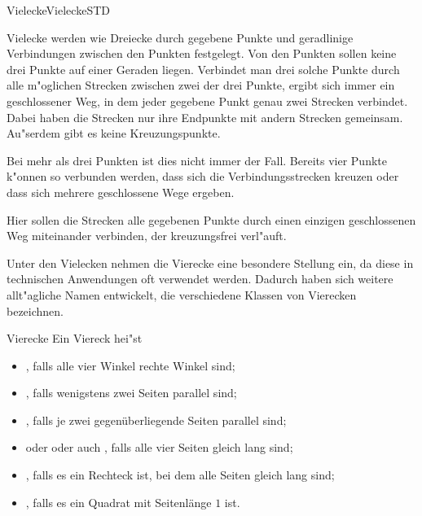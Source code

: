 \begin{MXContent}{Vielecke}{Vielecke}{STD}

Vielecke werden wie Dreiecke durch gegebene Punkte und geradlinige Verbindungen
zwischen den Punkten festgelegt. Von den Punkten sollen keine drei Punkte auf
einer Geraden liegen. Verbindet man drei solche Punkte durch alle m"oglichen 
Strecken zwischen zwei der drei Punkte, ergibt sich immer ein geschlossener Weg,
in dem jeder gegebene Punkt genau zwei Strecken verbindet. 
Dabei haben die Strecken nur ihre Endpunkte mit andern Strecken gemeinsam. 
Au"serdem gibt es keine Kreuzungspunkte.

Bei mehr als drei Punkten ist dies nicht immer der Fall. Bereits vier Punkte 
k"onnen so verbunden werden, dass sich die Verbindungsstrecken kreuzen oder 
dass sich mehrere geschlossene Wege ergeben.

Hier sollen die Strecken alle gegebenen Punkte durch einen einzigen 
geschlossenen Weg miteinander verbinden, der kreuzungsfrei verl"auft.

Unter den Vielecken nehmen die Vierecke eine besondere Stellung ein, da 
diese in technischen Anwendungen oft verwendet werden. Dadurch haben sich 
weitere allt"agliche Namen entwickelt, die verschiedene Klassen von Vierecken 
bezeichnen.

\begin{MXInfo}{Vierecke}%
Ein Viereck hei"st
\begin{itemize}
 \item {}, falls alle vier Winkel rechte Winkel sind;
 \item {}, falls wenigstens zwei Seiten parallel sind;
 \item {}, falls je zwei 
  gegen\"uberliegende Seiten parallel sind;
 \item {} oder  oder 
  auch , falls alle vier Seiten gleich lang sind;
 \item {}, falls es ein Rechteck ist, bei dem alle 
  Seiten gleich lang sind;
 \item {}, falls es ein Quadrat mit 
  Seitenl\"ange $1$ ist.
\end{itemize}
\end{MXInfo}


\end{MXContent}
